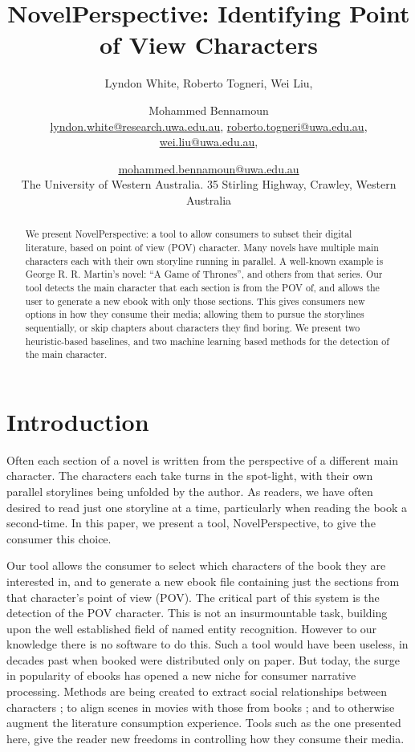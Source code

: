 \documentclass[11pt,a4paper]{article}
\title{NovelPerspective: Identifying Point of View Characters}
\author{Lyndon White, %
	Roberto Togneri, %
	Wei Liu, %
	\and Mohammed Bennamoun%
	\\ 
	\url{lyndon.white@research.uwa.edu.au}, %
	\url{roberto.togneri@uwa.edu.au},\\
	\url{wei.liu@uwa.edu.au}, %
	\and \url{mohammed.bennamoun@uwa.edu.au}%
	\\
	The University of Western Australia.
	35 Stirling Highway, Crawley, Western Australia
}
\newcommand{\parencite}{\citep}
\begin{document}
\maketitle

\begin{abstract}
We present NovelPerspective: a tool to allow consumers to subset their digital literature, based on point of view (POV) character.
Many novels have multiple main characters each with their own storyline running in parallel.
A well-known example is George R. R. Martin's  novel: ``A Game of Thrones'', and others from that series.
Our tool detects the main character that each section is from the POV of,
and allows the user to generate a new ebook with only those sections.
This gives consumers new options in how they consume their media; allowing them to  pursue the storylines sequentially, or skip chapters about characters they find boring.
We present two heuristic-based baselines, and two machine learning based methods for the detection of the main character.
\end{abstract}

\section{Introduction}
Often each section of a novel is written  from the perspective of a different main character.
The characters each take turns in the spot-light,
with their own parallel storylines being unfolded by the author.
As readers, we have often desired to read just one storyline at a time, particularly when reading the book a second-time.
In this paper, we present a tool, NovelPerspective, to give the consumer this choice.

Our tool allows the consumer to select which characters of the book they are interested in,
and to generate a new ebook file containing just the sections from that character's point of view (POV).
The critical part of this system is the detection of the POV character.
This is not an insurmountable task, building upon the well established field of named entity recognition.
However to our knowledge there is no software to do this.
Such a tool would have been useless, in decades past when booked were distributed only on paper.
But today, the surge in popularity of ebooks has opened a new niche for consumer narrative processing.
Methods are being created to extract social relationships between characters \parencite{elson2010socialnetworks,wohlgenannt2016extracting};
to align scenes in movies with those from books \parencite{moviebook}; and to otherwise augment the literature consumption experience.
Tools such as the one presented here, give the reader new freedoms in controlling how they consume their media.
\end{document}
